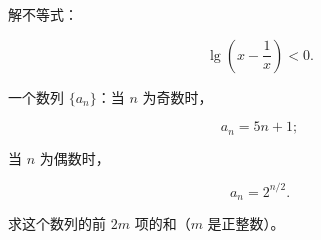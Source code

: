 \begin{question}
解不等式：

\nopagebreak[4]
\[
\lg\left(x-\frac1x\right)<0.
\]

\end{question}
\begin{question}
一个数列 $\{a_n\}$：当 $n$ 为奇数时，

\nopagebreak[4]
\[
a_n=5n+1;
\]

当 $n$ 为偶数时，

\nopagebreak[4]
\[
a_n=2^{n/2}.
\]

求这个数列的前 $2m$ 项的和（$m$ 是正整数）。

\end{question}